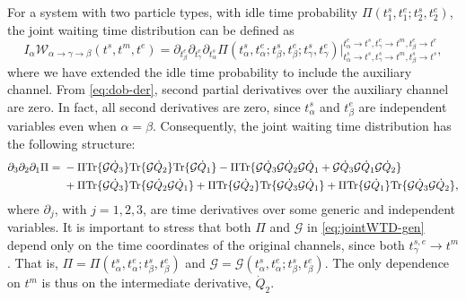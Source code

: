 \documentclass[aps,prl,amsmath,twocolumn,floatfix,superscriptaddress,longbibliography,footinbib]{revtex4-1}
\begin{document}
For a system with two particle types, with idle time probability $\Pi(t^s_1,t^e_1;t^s_2,t^e_2)$, the joint waiting time distribution can be defined as~\cite{Dasenbrook2015}
\begin{equation}
	I_{\alpha} \mathcal{W}_{\alpha \rightarrow \gamma \rightarrow \beta}(t^s,t^m,t^e)  = \partial_{t^{e}_\beta} \partial_{t^{e}_\gamma} \partial_{t^{s}_\alpha} \Pi( t_{\alpha}^s,t_{\alpha}^e;t_{\beta}^s,t_\beta^e;t_{\gamma}^s,t_{\gamma}^e ) 
	\big|_{t^{s}_\alpha \rightarrow t^s,t^{s}_\gamma \rightarrow t^m,t^s_\beta \rightarrow t^s}^{t^e_\alpha \rightarrow t^s, t^e_\gamma \rightarrow t^m, t^{e}_\beta\rightarrow t^e}  ,
	\label{eq:JWTD}
\end{equation}
where we have extended the idle time probability to include the auxiliary channel. From \cref{eq:dob-der}, second partial derivatives over the auxiliary channel are zero. In fact, all second derivatives are zero, since $t^s_\alpha$ and $t^e_\beta$ are independent variables even when $\alpha=\beta$. Consequently, the joint waiting time distribution has the following structure:
\begin{align}
	\partial_3 \partial_2 \partial_1 \Pi = {}& 
	-\Pi \mathrm{Tr}\{ \mathcal{G} \dot{Q}_3 \} \mathrm{Tr}\{ \mathcal{G} \dot{Q}_2 \} \mathrm{Tr}\{ \mathcal{G} \dot{Q}_1 \} 
	- \Pi \mathrm{Tr}\{ \mathcal{G} \dot{Q}_3 \mathcal{G} \dot{Q}_2 \mathcal{G} \dot{Q}_1 + \mathcal{G} \dot{Q}_3 \mathcal{G} \dot{Q}_1 \mathcal{G} \dot{Q}_2  \} \notag \\
	& + \Pi \mathrm{Tr}\{ \mathcal{G} \dot{Q}_3 \} \mathrm{Tr}\{ \mathcal{G} \dot{Q}_2 \mathcal{G} \dot{Q}_1 \} 
	+ \Pi \mathrm{Tr}\{ \mathcal{G} \dot{Q}_2 \} \mathrm{Tr}\{ \mathcal{G} \dot{Q}_3 \mathcal{G} \dot{Q}_1 \}
	+ \Pi \mathrm{Tr}\{ \mathcal{G} \dot{Q}_1 \} \mathrm{Tr}\{ \mathcal{G} \dot{Q}_3 \mathcal{G} \dot{Q}_2 \} ,
	\label{eq:jointWTD-gen}
\end{align}
where $\partial_{j}$, with $j=1,2,3$, are time derivatives over some generic and independent variables. It is important to stress that both $\Pi$ and $\mathcal{G}$ in \cref{eq:jointWTD-gen} depend only on the time coordinates of the original channels, since both $t^{s,e}_\gamma\rightarrow t^m$. That is, $\Pi=\Pi(t_{\alpha}^s,t_{\alpha}^e;t_{\beta}^s,t_\beta^e)$ and $\mathcal{G}=\mathcal{G}(t_{\alpha}^s,t_{\alpha}^e;t_{\beta}^s,t_\beta^e)$. The only dependence on $t^m$ is thus on the intermediate derivative, $\dot{Q}_2$. 
\end{document}

